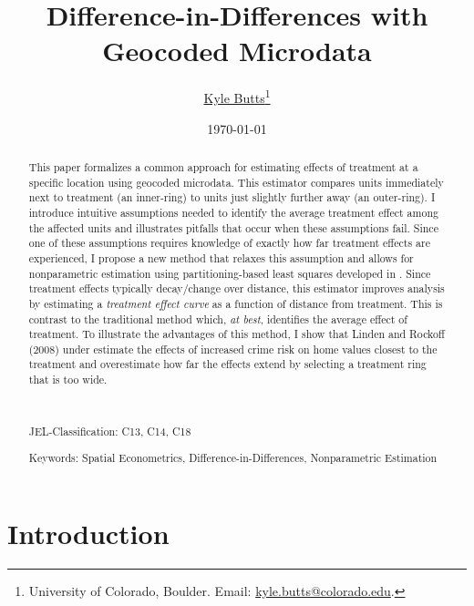 \documentclass[10pt]{article}
\title{Difference-in-Differences with Geocoded Microdata}
\author{\href{https://kylebutts.com/}{Kyle Butts}\thanks{University of Colorado, Boulder. Email: \href{mailto:kyle.butts@colorado.edu}{kyle.butts@colorado.edu}.} %
}
\date{\today}
\begin{document}
\begin{titlepage}
\maketitle

\begin{abstract}
    This paper formalizes a common approach for estimating effects of treatment at a specific location using geocoded microdata. This estimator compares units immediately next to treatment (an inner-ring) to units just slightly further away (an outer-ring). I introduce intuitive assumptions needed to identify the average treatment effect among the affected units and illustrates pitfalls that occur when these assumptions fail. Since one of these assumptions requires knowledge of exactly how far treatment effects are experienced, I propose a new method that relaxes this assumption and allows for nonparametric estimation using partitioning-based least squares developed in \citet{Cattaneo_Crump_Farrell_Feng_2019,Cattaneo_Crump_Farrell_Feng_2019}. Since treatment effects typically decay/change over distance, this estimator improves analysis by estimating a \emph{treatment effect curve} as a function of distance from treatment. This is contrast to the traditional method which, \emph{at best}, identifies the average effect of treatment. To illustrate the advantages of this method, I show that Linden and Rockoff (2008) under estimate the effects of increased crime risk on home values closest to the treatment and overestimate how far the effects extend by selecting a treatment ring that is too wide.

    \par~\par\noindent
    {\color{asher}JEL-Classification:} C13, C14, C18
    \par\noindent
    {\color{asher}Keywords:} Spatial Econometrics, Difference-in-Differences, Nonparametric Estimation
    \par\vspace{-2.5mm}
\end{abstract}
\end{titlepage}


\section{Introduction}
\end{document}
